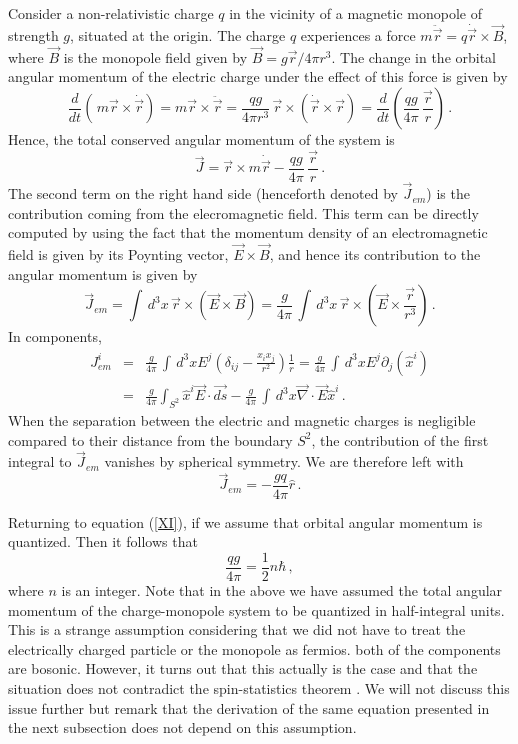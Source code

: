 Consider a non-relativistic charge $q$ in the vicinity of a magnetic
monopole of strength $g$, situated at the origin. The charge $q$
experiences a force $m\ddot{\vec{r}}=q\dot{\vec{r}}\times\vec{B}$,
where $\vec{B}$ is the monopole field given by $\vec{B}= 
g\vec{r}/4\pi r^3$. The change in the orbital angular momentum of the
electric charge under the effect of this force is given by 
$$
\frac{d}{dt}\left(\,m\vec{r}\times\dot{\vec{r}}\right) =
m\vec{r}\times\ddot{\vec{r}}= \frac{qg}{4 \pi r^{3}}\,
\vec{r}\times\left(\dot{\vec{r}}\times\vec{r}\right)= 
\frac{d}{dt}\left(\frac{qg}{4\pi}\,\frac{\vec{r}}{r}\right)\,.
$$
Hence, the total conserved angular momentum of the system is
\begin{equation}
\vec{J}=\vec{r}\times m\dot{\vec{r}}-\frac{qg}{4\pi}\,
\frac{\vec{r}}{r}\,.
\label{XI}
\end{equation}
The second term on the right hand side (henceforth denoted by
$\vec{J}_{em}$) is the contribution coming from the elecromagnetic
field.  This term can be directly computed by using the fact that the
momentum density of an electromagnetic field is given by its Poynting
vector, $\vec{E}\times\vec{B}$, and hence its contribution to the
angular momentum is given by
$$
\vec{J}_{em} = \int \, d^{3}x \, \vec{r} \times
(\vec{E} \times \vec{B}) = \frac{g}{4 \pi} \,
\int \, d^{3} x \, \vec{r} \times
\left( \vec{E} \times \frac{\vec{r}}{r^{3}} \right)\,.
$$
In components,
\begin{eqnarray}
J^i_{em} & = & \frac{g}{4 \pi} \, \int \, d^{3}x E^{j}
\left( \delta_{ij} - \frac{x_i x_j}{r^{2}} \right )
\frac{1}{r} = \frac{g}{4 \pi} \, \int \, d^{3}x E^{j}
\partial_{j} (\hat{x}^{i}) \nonumber \\
& = & \frac{g}{4 \pi} \int_{S^2} \hat{x}^i \vec{E}\cdot \vec{ds} 
- \frac{g}{4 \pi} \, \int \, d^{3}x \vec{\nabla} \cdot
\vec{E} \hat{x}^{i}\,. 
\label{XIV}
\end{eqnarray}
When the separation between the electric and magnetic charges is
negligible compared to their distance from the boundary $S^2$, the
contribution of the first integral to $\vec{J}_{em}$ vanishes by
spherical symmetry. We are therefore left with   
\begin{equation}
\vec{J}_{em}= -\frac{gq}{4 \pi} \hat{r}
\label{Jem}\,.
\end{equation}

Returning to equation (\ref{XI}), if we assume that orbital angular
momentum is quantized. Then it follows that 
\begin{equation}
\frac{qg}{4 \pi} = \frac{1}{2} n \hbar\,,
\label{XII}
\end{equation}
where $n$ is an integer. Note that in the above we have assumed the
total angular momentum of the charge-monopole system to be quantized
in half-integral units. This is a strange assumption considering that
we did not have to treat the electrically charged particle or the
monopole as fermios.  both of the components are bosonic. However, it
turns out that this actually is the case and that the situation does
not contradict the spin-statistics theorem
\cite{Goldhaber,Wilczek}. We will not discuss this issue further but
remark that the derivation of the same equation presented in the next
subsection does not depend on this assumption.


